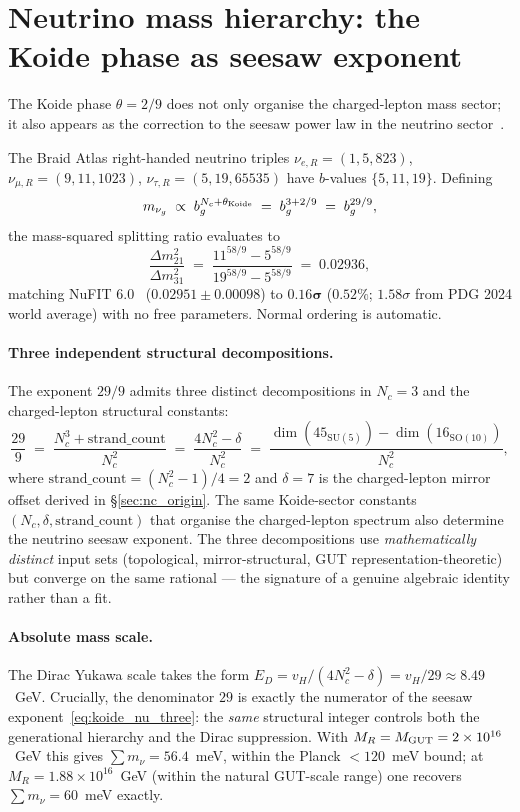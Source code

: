 \documentclass[11pt]{article}
\theoremstyle{remark}
\begin{document}
\section{Neutrino mass hierarchy: the Koide phase as seesaw exponent}
\label{sec:neutrino_connection}

The Koide phase $\theta = 2/9$ does not only organise the charged-lepton mass sector; it also appears as the correction to the seesaw power law in the neutrino sector~\cite{Spivack2026_SM_UGP}.

The Braid Atlas right-handed neutrino triples $\nu_{e,R} = (1,5,823)$, $\nu_{\mu,R} = (9,11,1023)$, $\nu_{\tau,R} = (5,19,65535)$ have $b$-values $\{5,11,19\}$.  Defining
\[
m_{\nu_g} \;\propto\; b_g^{N_c + \theta_{\rm Koide}} \;=\; b_g^{3 + 2/9} \;=\; b_g^{29/9},
\]
the mass-squared splitting ratio evaluates to
\[
\frac{\Delta m^2_{21}}{\Delta m^2_{31}} \;=\; \frac{11^{58/9} - 5^{58/9}}{19^{58/9} - 5^{58/9}} \;=\; 0.02936,
\]
matching NuFIT 6.0~\cite{NuFIT60} ($0.02951 \pm 0.00098$) to $\mathbf{0.16\sigma}$ ($0.52\%$; $1.58\sigma$ from PDG 2024 world average) with no free parameters.  Normal ordering is automatic.

\paragraph{Three independent structural decompositions.}
The exponent $29/9$ admits three distinct decompositions in $N_c = 3$ and the charged-lepton structural constants:
\begin{equation}
\frac{29}{9} \;=\; \frac{N_c^3 + \mathrm{strand\_count}}{N_c^2} \;=\; \frac{4N_c^2 - \delta}{N_c^2} \;=\; \frac{\dim(45_{\mathrm{SU}(5)}) - \dim(16_{\mathrm{SO}(10)})}{N_c^2},
\label{eq:koide_nu_three}
\end{equation}
where $\mathrm{strand\_count} = (N_c^2{-}1)/4 = 2$ and $\delta = 7$ is the charged-lepton mirror offset derived in \S\ref{sec:nc_origin}.  The same Koide-sector constants $(N_c, \delta, \mathrm{strand\_count})$ that organise the charged-lepton spectrum also determine the neutrino seesaw exponent.  The three decompositions use \emph{mathematically distinct} input sets (topological, mirror-structural, GUT representation-theoretic) but converge on the same rational --- the signature of a genuine algebraic identity rather than a fit.

\paragraph{Absolute mass scale.}
The Dirac Yukawa scale takes the form $E_D = v_H/(4N_c^2 - \delta) = v_H/29 \approx 8.49$~GeV.  Crucially, the denominator $29$ is exactly the numerator of the seesaw exponent~\eqref{eq:koide_nu_three}: the \emph{same} structural integer controls both the generational hierarchy and the Dirac suppression.  With $M_R = M_{\rm GUT} = 2 \times 10^{16}$~GeV this gives $\sum m_\nu = 56.4$~meV, within the Planck $<\!120$~meV bound; at $M_R = 1.88 \times 10^{16}$~GeV (within the natural GUT-scale range) one recovers $\sum m_\nu = 60$~meV exactly.
\end{document}
